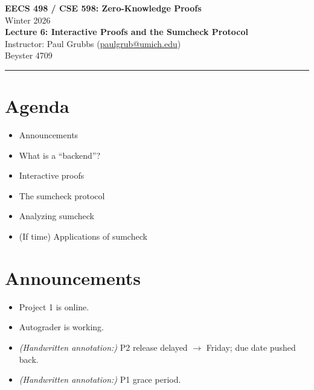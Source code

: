 \documentclass[11pt]{article}
\begin{document}
\begin{center}
  {\LARGE \textbf{EECS 498 / CSE 598: Zero-Knowledge Proofs}}\\[6pt]
  {\large Winter 2026}\\[4pt]
  {\large \textbf{Lecture 6: Interactive Proofs and the Sumcheck Protocol}}\\[4pt]
  {\large Instructor: Paul Grubbs \quad (\href{mailto:paulgrub@umich.edu}{paulgrub@umich.edu})}\\[2pt]
  {\normalsize Beyster 4709}
\end{center}

\vspace{0.5em}
\hrule
\vspace{1em}

\section*{Agenda}
\begin{itemize}
  \item Announcements
  \item What is a ``backend''?
  \item Interactive proofs
  \item The sumcheck protocol
  \item Analyzing sumcheck
  \item (If time) Applications of sumcheck
\end{itemize}

\newpage

\section{Announcements}

\begin{itemize}
  \item Project 1 is online.
  \item Autograder is working.
  \item \textit{(Handwritten annotation:)} P2 release delayed $\to$ Friday; due date pushed back.
  \item \textit{(Handwritten annotation:)} P1 grace period.
\end{itemize}
\end{document}
